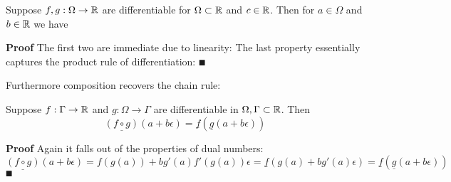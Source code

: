 \begin{lemma} Suppose $f,g : \Omega \rightarrow {\mathbb R}$ are differentiable for $\Omega \subset {\mathbb R}$ and $c \in {\mathbb R}$. Then for $a \ensuremath{\in} \ensuremath{\Omega}$ and $b \in {\mathbb R}$ we have
\end{lemma}
\textbf{Proof} The first two are immediate due to linearity:
The last property essentially captures the product rule of differentiation:
\ensuremath{\QED}

Furthermore composition recovers the chain rule:

\begin{lemma}[composition]  Suppose $f : \Gamma \rightarrow {\mathbb R}$ and $g : \ensuremath{\Omega} \ensuremath{\rightarrow} \ensuremath{\Gamma}$ are differentiable in $\Omega,\Gamma \subset {\mathbb R}$. Then
\[
\underline{(f \ensuremath{\circ} g)}(a+b \ensuremath{\epsilon}) = \underline{f}(\underline{g}(a+b\ensuremath{\epsilon}))
\]
\end{lemma}
\textbf{Proof} Again it falls out of the properties of dual numbers:
\[
\underline{(f \ensuremath{\circ} g)}(a+b \ensuremath{\epsilon}) = f(g(a)) + bg'(a) f'(g(a)) \ensuremath{\epsilon} = \underline{f}(g(a)+bg'(a)\ensuremath{\epsilon}) = \underline{f}(\underline{g}(a+b\ensuremath{\epsilon}))
\]
\ensuremath{\QED}

